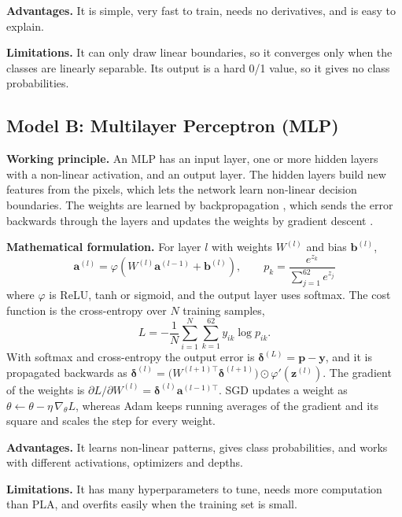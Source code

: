 \documentclass[12pt,a4paper]{article}
\begin{document}
\textbf{Advantages.} It is simple, very fast to train, needs no derivatives, and is easy to explain.

\textbf{Limitations.} It can only draw linear boundaries, so it converges only when the classes are linearly separable. Its output is a hard 0/1 value, so it gives no class probabilities.

\subsection{Model B: Multilayer Perceptron (MLP)}
\textbf{Working principle.} An MLP has an input layer, one or more hidden layers with a non-linear activation, and an output layer. The hidden layers build new features from the pixels, which lets the network learn non-linear decision boundaries. The weights are learned by backpropagation \cite{rumelhart}, which sends the error backwards through the layers and updates the weights by gradient descent \cite{goodfellow}.

\textbf{Mathematical formulation.} For layer $l$ with weights $W^{(l)}$ and bias $\mathbf{b}^{(l)}$,
\begin{equation}
\mathbf{a}^{(l)} = \varphi\!\left(W^{(l)}\mathbf{a}^{(l-1)} + \mathbf{b}^{(l)}\right), \qquad p_k = \frac{e^{z_k}}{\sum_{j=1}^{62} e^{z_j}}
\end{equation}
where $\varphi$ is ReLU, tanh or sigmoid, and the output layer uses softmax. The cost function is the cross-entropy over $N$ training samples,
\begin{equation}
L = -\frac{1}{N}\sum_{i=1}^{N}\sum_{k=1}^{62} y_{ik}\log p_{ik}.
\end{equation}
With softmax and cross-entropy the output error is $\boldsymbol{\delta}^{(L)}=\mathbf{p}-\mathbf{y}$, and it is propagated backwards as $\boldsymbol{\delta}^{(l)}=\big(W^{(l+1)\top}\boldsymbol{\delta}^{(l+1)}\big)\odot\varphi'(\mathbf{z}^{(l)})$. The gradient of the weights is $\partial L/\partial W^{(l)}=\boldsymbol{\delta}^{(l)}\mathbf{a}^{(l-1)\top}$. SGD updates a weight as $\theta\leftarrow\theta-\eta\,\nabla_\theta L$, whereas Adam \cite{adam} keeps running averages of the gradient and its square and scales the step for every weight.

\textbf{Advantages.} It learns non-linear patterns, gives class probabilities, and works with different activations, optimizers and depths.

\textbf{Limitations.} It has many hyperparameters to tune, needs more computation than PLA, and overfits easily when the training set is small.
\end{document}
